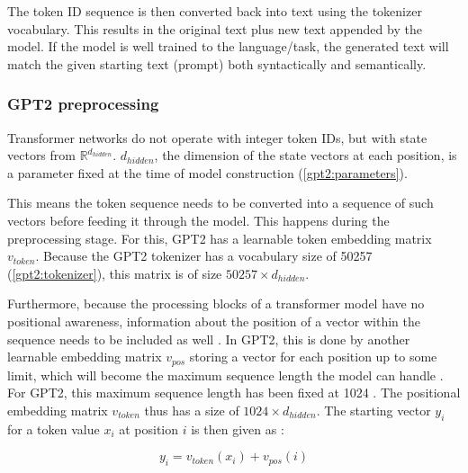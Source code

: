 The token ID sequence is then converted back into text using the tokenizer vocabulary. This results in the original text plus new text appended by the model. If the model is well trained to the language/task, the generated text will match the given starting text (prompt) both syntactically and semantically.

\subsubsection{GPT2 preprocessing}
\label{gpt2_preproc}


Transformer networks do not operate with integer token IDs, but with state vectors from $\mathbb{R}^{d_{hidden}}$. $d_{hidden}$, the dimension of the state vectors at each position, is a parameter fixed at the time of model construction (\ref{gpt2:parameters}).

This means the token sequence needs to be converted into a sequence of such vectors before feeding it through the model. This happens during the preprocessing stage.
For this, GPT2 has a learnable token embedding matrix $v_{token}$.  Because the GPT2 tokenizer has a vocabulary size of 50257 (\ref{gpt2:tokenizer}), this matrix is of size $50257 \times d_{hidden}$.

\begin{samepage}

Furthermore, because the processing blocks of a transformer model have no positional awareness, information about the position of a vector within the sequence needs to be included as well .
In GPT2, this is done by another learnable embedding matrix $v_{pos}$ storing a vector for each position up to some limit, which will become the maximum sequence length the model can handle   . For GPT2, this maximum sequence length has been fixed at 1024  \cite{HuggingFaceGPT2}.
The positional embedding matrix $v_{token}$ thus has a size of $1024 \times d_{hidden}$.
The starting vector $y_i$ for a token value $x_i$ at position $i$ is then given as :

$$y_i = v_{token}(x_i) + v_{pos}(i)$$

\end{samepage}


